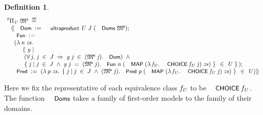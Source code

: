 \documentclass{llncs}
\newtheorem{defn}{Definition}[chapter]
\newenvironment{holmath}{\begin{displaymath}\begin{array}{l}}{\end{array}\end{displaymath}\ignorespacesafterend}
\renewcommand{\HOLConst}[1]{{\textsf{\upshape\small #1}}}
\renewcommand{\HOLinline}[1]{\ensuremath{#1}}
\renewcommand{\HOLFieldName}[1]{\HOLConst{#1}}
\renewcommand{\HOLTokenLeftrec}{\ensuremath{\langle\!\langle}}
\renewcommand{\HOLTokenRightrec}{\ensuremath{\rangle\!\rangle}}
\renewcommand{\HOLTokenBar}{\mbox{$|$}}
\begin{document}
\begin{defn}
{\upshape\cite[Definition A.18 (Ultraproduct of First-Order Models)]{Blackburn}}
\begin{holmath}
  {}^{\sf f}\Pi\sb{\HOLFreeVar{U}}\;\HOLFreeVar{\ensuremath{\mathfrak{M}\sp{\sf s}}}\;\HOLTokenDefEquality{}\\
\;\;\HOLTokenLeftrec{}\HOLFieldName{Dom}\;:=\;\HOLConst{ultraproduct}\;\HOLFreeVar{U}\;\HOLFreeVar{J}\;(\HOLConst{Doms}\;\HOLFreeVar{\ensuremath{\mathfrak{M}\sp{\sf s}}});\\
\;\;\HOLFieldName{Fun}\;:=\\
\;\;\;\;(\HOLTokenLambda{}\HOLBoundVar{n}\;\HOLBoundVar{zs}.\\
\;\;\;\;\;\;\;\;\;\HOLTokenLeftbrace{}\HOLBoundVar{y}\;\HOLTokenBar{}\\
\;\;\;\;\;\;\;\;\;\;(\HOLSymConst{\HOLTokenForall{}}\HOLBoundVar{j}.\;\HOLBoundVar{j}\;\HOLSymConst{\HOLTokenIn{}}\;\HOLFreeVar{J}\;\HOLSymConst{\HOLTokenImp{}}\;\HOLBoundVar{y}\;\HOLBoundVar{j}\;\HOLSymConst{\HOLTokenIn{}}\;(\HOLFreeVar{\ensuremath{\mathfrak{M}\sp{\sf s}}}\;\HOLBoundVar{j}).\HOLFieldName{Dom})\;\HOLSymConst{\HOLTokenConj{}}\\
\;\;\;\;\;\;\;\;\;\;\HOLTokenLeftbrace{}\HOLBoundVar{j}\;\HOLTokenBar{}\;\HOLBoundVar{j}\;\HOLSymConst{\HOLTokenIn{}}\;\HOLFreeVar{J}\;\HOLSymConst{\HOLTokenConj{}}\;\HOLBoundVar{y}\;\HOLBoundVar{j}\;\HOLSymConst{=}\;(\HOLFreeVar{\ensuremath{\mathfrak{M}\sp{\sf s}}}\;\HOLBoundVar{j}).\HOLFieldName{Fun}\;\HOLBoundVar{n}\;(\HOLConst{MAP}\;(\HOLTokenLambda{}\HOLBoundVar{\ensuremath{f\sb{U}}}.\;\HOLConst{CHOICE}\;\HOLBoundVar{\ensuremath{f\sb{U}}}\;\HOLBoundVar{j})\;\HOLBoundVar{zs})\HOLTokenRightbrace{}\;\HOLSymConst{\HOLTokenIn{}}\;\HOLFreeVar{U}\HOLTokenRightbrace{});\\
\;\;\HOLFieldName{Pred}\;:=\;(\HOLTokenLambda{}\HOLBoundVar{p}\;\HOLBoundVar{zs}.\;\HOLTokenLeftbrace{}\HOLBoundVar{j}\;\HOLTokenBar{}\;\HOLBoundVar{j}\;\HOLSymConst{\HOLTokenIn{}}\;\HOLFreeVar{J}\;\HOLSymConst{\HOLTokenConj{}}\;(\HOLFreeVar{\ensuremath{\mathfrak{M}\sp{\sf s}}}\;\HOLBoundVar{j}).\HOLFieldName{Pred}\;\HOLBoundVar{p}\;(\HOLConst{MAP}\;(\HOLTokenLambda{}\HOLBoundVar{\ensuremath{f\sb{U}}}.\;\HOLConst{CHOICE}\;\HOLBoundVar{\ensuremath{f\sb{U}}}\;\HOLBoundVar{j})\;\HOLBoundVar{zs})\HOLTokenRightbrace{}\;\HOLSymConst{\HOLTokenIn{}}\;\HOLFreeVar{U})\HOLTokenRightrec{}
\end{holmath}
\end{defn}
Here we fix the representative of each equivalence class \HOLinline{\HOLFreeVar{\ensuremath{f\sb{U}}}} to be \HOLinline{\HOLConst{CHOICE}\;\HOLFreeVar{\ensuremath{f\sb{U}}}}. The function \HOLinline{\HOLConst{Doms}} takes a family of first-order models to the family of their domains. 
\end{document}
